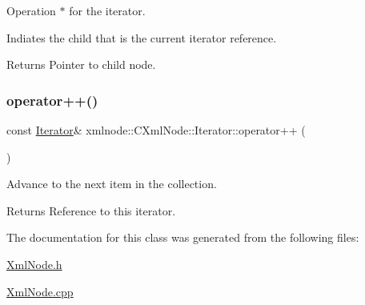 Operation $\ast$ for the iterator. 

Indiates the child that is the current iterator reference.

\begin{DoxyReturn}{Returns}
Pointer to child node. 
\end{DoxyReturn}
\mbox{\label{classxmlnode_1_1_c_xml_node_1_1_iterator_aefa7392f7c198dcf907d8458fbf0db1a}} 
\subsubsection{\texorpdfstring{operator++()}{operator++()}}
{\footnotesize\ttfamily const \mbox{\hyperlink{classxmlnode_1_1_c_xml_node_1_1_iterator}{Iterator}}\& xmlnode\+::\+C\+Xml\+Node\+::\+Iterator\+::operator++ (\begin{DoxyParamCaption}{ }\end{DoxyParamCaption})\hspace{0.3cm}{\ttfamily [inline]}}



Advance to the next item in the collection. 

\begin{DoxyReturn}{Returns}
Reference to this iterator. 
\end{DoxyReturn}


The documentation for this class was generated from the following files\+:\begin{DoxyCompactItemize}
\item 
\mbox{\hyperlink{_xml_node_8h}{Xml\+Node.\+h}}\item 
\mbox{\hyperlink{_xml_node_8cpp}{Xml\+Node.\+cpp}}\end{DoxyCompactItemize}
